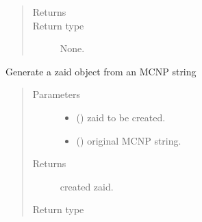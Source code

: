 \documentclass[letterpaper,10pt,english]{sphinxmanual}
\begin{document}
\begin{fulllineitems}
\begin{quote}
\begin{description}
\begin{itemize}
\end{itemize}

\item[{Returns}] \leavevmode
\sphinxAtStartPar


\item[{Return type}] \leavevmode
\sphinxAtStartPar
None.

\end{description}\end{quote}

\begin{fulllineitems}
\label{\detokenize{api/inputgeneration:matreader.Zaid.from_string}}
\sphinxAtStartPar
Generate a zaid object from an MCNP string
\begin{quote}\begin{description}
\item[{Parameters}] \leavevmode\begin{itemize}
\item {} 
\sphinxAtStartPar
{} ({\hyperref[\detokenize{api/inputgeneration:matreader.Zaid}]{}}) \textendash{} zaid to be created.

\item {} 
\sphinxAtStartPar
{} () \textendash{} original MCNP string.

\end{itemize}

\item[{Returns}] \leavevmode
\sphinxAtStartPar
created zaid.

\item[{Return type}] \leavevmode
\sphinxAtStartPar
{\hyperref[\detokenize{api/inputgeneration:matreader.Zaid}]{}}

\end{description}\end{quote}

\end{fulllineitems}



\end{fulllineitems}
\end{document}
